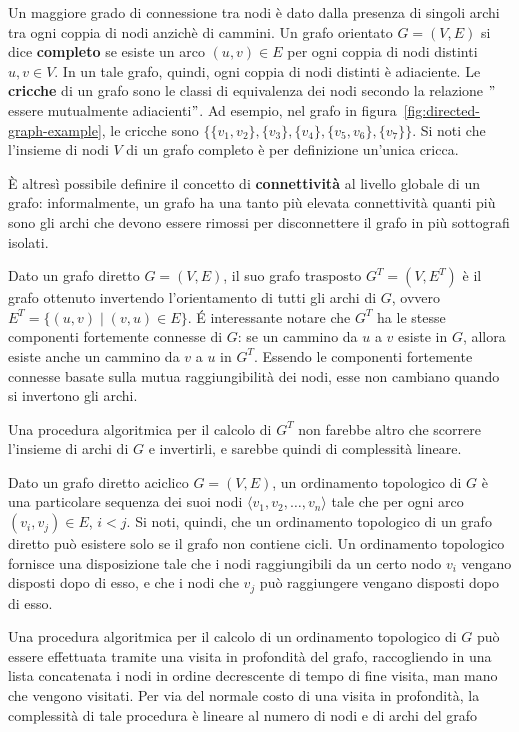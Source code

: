 Un maggiore grado di connessione tra nodi \`e dato dalla presenza di singoli archi tra ogni coppia di nodi anzich\`e
di cammini. \newline
Un grafo orientato $G = (V, E)$ si dice \textbf{completo} se esiste un arco $(u, v) \in E$ per ogni coppia di nodi
distinti $u, v \in V$.
In un tale grafo, quindi, ogni coppia di nodi distinti \`e adiaciente.
Le \textbf{cricche} di un grafo sono le classi di equivalenza dei nodi secondo la relazione
\("\)essere mutualmente adiacienti\("\).
Ad esempio, nel grafo in figura~\ref{fig:directed-graph-example}, le cricche sono
$\{\{v_1, v_2\}, \{v_3\}, \{v_4\}, \{v_5, v_6\}, \{v_7\}\}$.
Si noti che l'insieme di nodi $V$ di un grafo completo \`e per definizione un'unica cricca.

\`E altresì possibile definire il concetto di \textbf{connettività} al livello globale di un grafo: informalmente,
un grafo ha una tanto più elevata connettività quanti più sono gli archi che devono essere rimossi per disconnettere
il grafo in più sottografi isolati.


Dato un grafo diretto $G = (V, E)$, il suo grafo trasposto $G^T = (V, E^T)$ \`e il grafo ottenuto invertendo
l'orientamento di tutti gli archi di $G$, ovvero $E^T = \{(u, v) \mid (v, u) \in E\}$.
 \'E interessante notare che $G^T$ ha le stesse componenti fortemente connesse di $G$: se un cammino da $u$ a $v$
esiste in $G$, allora esiste anche un cammino da $v$ a $u$ in $G^T$.
Essendo le componenti fortemente connesse basate sulla mutua raggiungibilit\`a dei nodi, esse non cambiano
quando si invertono gli archi.

Una procedura algoritmica per il calcolo di $G^T$ non farebbe altro che scorrere l'insieme di archi di $G$ e
invertirli, e sarebbe quindi di complessit\`a lineare.


Dato un grafo diretto aciclico $G = (V, E)$, un ordinamento topologico di $G$ \`e una particolare sequenza
dei suoi nodi $\langle v_1, v_2, \ldots, v_n \rangle$ tale che per ogni arco $(v_i, v_j) \in E$, $i < j$.
Si noti, quindi, che un ordinamento topologico di un grafo diretto pu\`o esistere solo se il grafo non contiene
cicli.
Un ordinamento topologico fornisce una disposizione tale che i nodi raggiungibili da un certo nodo $v_i$ vengano
disposti dopo di esso, e che i nodi che $v_j$ pu\`o raggiungere vengano disposti dopo di esso.

Una procedura algoritmica per il calcolo di un ordinamento topologico di $G$ pu\`o essere effettuata tramite una
visita in profondit\`a del grafo, raccogliendo in una lista concatenata i nodi in ordine decrescente di tempo
di fine visita, man mano che vengono visitati.
Per via del normale costo di una visita in profondit\`a, la complessit\`a di tale procedura \`e lineare al
numero di nodi e di archi del grafo

